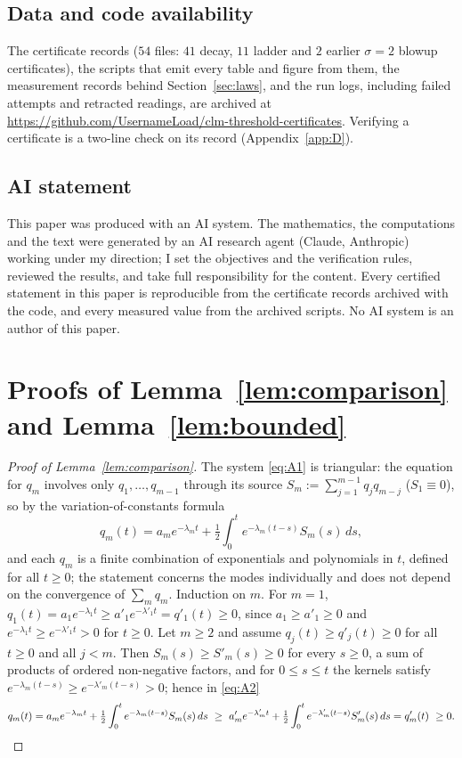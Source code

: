 \documentclass[11pt,a4paper]{article}
\theoremstyle{plain}
\theoremstyle{definition}
\begin{document}
\subsection*{Data and code availability}
The certificate records ($54$ files: $41$ decay, $11$ ladder and $2$ earlier $\sigma=2$ blowup certificates), the scripts that emit every table and figure from them, the measurement records behind Section~\ref{sec:laws}, and the run logs, including failed attempts and retracted readings, are archived at \url{https://github.com/UsernameLoad/clm-threshold-certificates}. Verifying a certificate is a two-line check on its record (Appendix~\ref{app:D}).

\subsection*{AI statement}
This paper was produced with an AI system. The mathematics, the computations and the text were generated by an AI research agent (Claude, Anthropic) working under my direction; I set the objectives and the verification rules, reviewed the results, and take full responsibility for the content. Every certified statement in this paper is reproducible from the certificate records archived with the code, and every measured value from the archived scripts. No AI system is an author of this paper.


\appendix

\section{Proofs of Lemma~\ref{lem:comparison} and Lemma~\ref{lem:bounded}}\label{app:A}

\begin{proof}[Proof of Lemma~\ref{lem:comparison}]
The system \eqref{eq:A1} is triangular: the equation for $q_m$ involves only $q_1,\dots,q_{m-1}$ through its source $S_m:=\sum_{j=1}^{m-1}q_jq_{m-j}$ ($S_1\equiv0$), so by the variation-of-constants formula
\begin{equation}\label{eq:A2}
q_m(t)=a_me^{-\lambda_mt}+\tfrac12\int_0^te^{-\lambda_m(t-s)}S_m(s)\,ds,
\end{equation}
and each $q_m$ is a finite combination of exponentials and polynomials in $t$, defined for all $t\ge0$; the statement concerns the modes individually and does not depend on the convergence of $\sum_mq_m$. Induction on $m$. For $m=1$, $q_1(t)=a_1e^{-\lambda_1t}\ge a'_1e^{-\lambda'_1t}=q'_1(t)\ge0$, since $a_1\ge a'_1\ge0$ and $e^{-\lambda_1t}\ge e^{-\lambda'_1t}>0$ for $t\ge0$. Let $m\ge2$ and assume $q_j(t)\ge q'_j(t)\ge0$ for all $t\ge0$ and all $j<m$. Then $S_m(s)\ge S'_m(s)\ge0$ for every $s\ge0$, a sum of products of ordered non-negative factors, and for $0\le s\le t$ the kernels satisfy $e^{-\lambda_m(t-s)}\ge e^{-\lambda'_m(t-s)}>0$; hence in \eqref{eq:A2}
\[
q_m(t)=a_me^{-\lambda_mt}+\tfrac12\int_0^te^{-\lambda_m(t-s)}S_m(s)\,ds\ \ge\ a'_me^{-\lambda'_mt}+\tfrac12\int_0^te^{-\lambda'_m(t-s)}S'_m(s)\,ds=q'_m(t)\ \ge0.\qedhere
\]
\end{proof}
\end{document}
